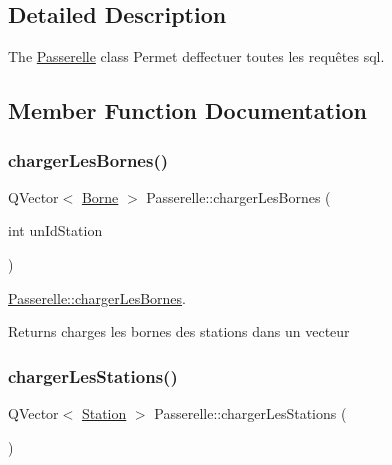 \subsection{Detailed Description}
The \hyperlink{class_passerelle}{Passerelle} class Permet d\textquotesingle{}effectuer toutes les requêtes sql. 

\subsection{Member Function Documentation}
\mbox{\label{class_passerelle_a82347f95ecee56a567c080102c137ccd}} 
\subsubsection{\texorpdfstring{charger\+Les\+Bornes()}{chargerLesBornes()}}
{\footnotesize\ttfamily Q\+Vector$<$ \hyperlink{class_borne}{Borne} $>$ Passerelle\+::charger\+Les\+Bornes (\begin{DoxyParamCaption}\item[{int}]{un\+Id\+Station }\end{DoxyParamCaption})\hspace{0.3cm}{\ttfamily [static]}}



\hyperlink{class_passerelle_a82347f95ecee56a567c080102c137ccd}{Passerelle\+::charger\+Les\+Bornes}. 

\begin{DoxyReturn}{Returns}
charges les bornes des stations dans un vecteur 
\end{DoxyReturn}
\mbox{\label{class_passerelle_a58f4340157dc6a2b5f720cf7ab09c980}} 
\subsubsection{\texorpdfstring{charger\+Les\+Stations()}{chargerLesStations()}}
{\footnotesize\ttfamily Q\+Vector$<$ \hyperlink{class_station}{Station} $>$ Passerelle\+::charger\+Les\+Stations (\begin{DoxyParamCaption}{ }\end{DoxyParamCaption})\hspace{0.3cm}{\ttfamily [static]}}



